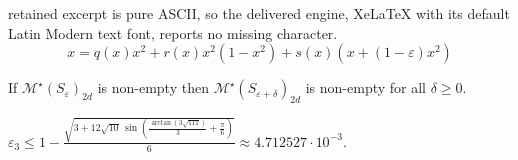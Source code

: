 \documentclass[10pt,a4paper]{amsart}
\newcommand{\cM}{\mathcal{M}} %
\begin{document}
retained excerpt is pure ASCII, so the delivered engine, XeLaTeX with its default Latin Modern text font, reports no missing character.
\begin{equation}\label{sosred}
x = q(x) x^2 + r(x)x^2(1-x^2)+s(x)(x+(1-\varepsilon)x^2)
\end{equation}

\begin{lemma}
\label{lemma:cMstar}
If $\cM^{\star}(S_{\varepsilon})_{2 d}$ is non-empty then
$\cM^{\star}(S_{\varepsilon+\delta})_{2 d}$ is non-empty for all $\delta\geq 0$. 
\end{lemma}

\begin{lemma}
\label{lemma:eps3}
$\varepsilon_3 \leq 1-\frac{\sqrt{3+12 \sqrt{10}\, \sin \! \left(\frac{\arctan \left(3 \sqrt{111}\right)}{3}+\frac{\pi}{6}\right)}}{6} \approx 4.712527\cdot 10^{-3}.$
\end{lemma}
\end{document}
